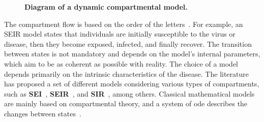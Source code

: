 \begin{figure}[!ht]
{
	
	} \caption{\textbf{Diagram of a dynamic compartmental model.}}
	\label{fig:dynamicmodel}
\end{figure}

The compartment flow is based on the order of the letters~\citep{amaku:2014}.
For example, an SEIR model states that individuals are initially susceptible to
the virus or disease, then they become exposed, infected, and finally recover.
The transition between states is not mandatory and depends on the model's
internal parameters, which aim to be as coherent as possible with reality. The
choice of a model depends primarily on the intrinsic characteristics of the
disease. The literature has proposed a set of different models considering
various types of compartments, such as \textbf{SEI}~\cite{Scoglio2021,
	Puntipa2023}, \textbf{SEIR}~\cite{Scoglio2021, Puntipa2023, Meng2023,
	da-silva:2020}, and \textbf{SIR}~\cite{Umar2022, Prasetyo2023, Srivastav2023},
among others.  Classical mathematical models are mainly based on compartmental
theory, and a system of \gls{ode} describes the changes between
states~\citep{da-silva:2020}.
